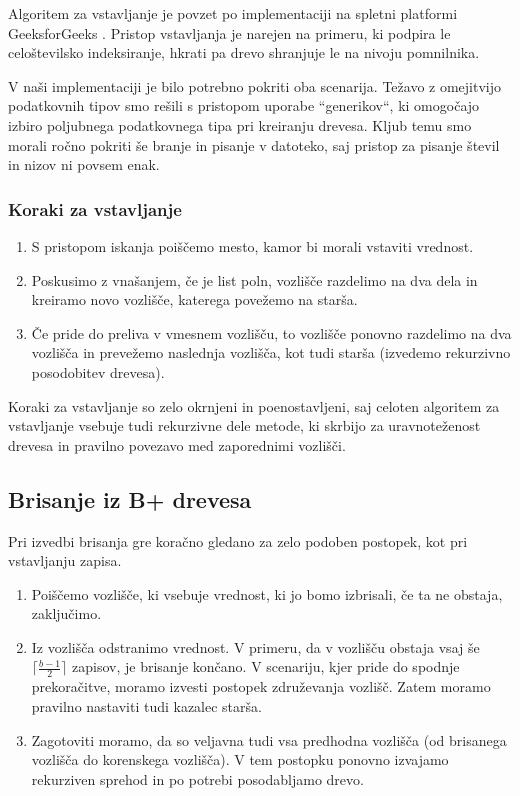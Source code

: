 \documentclass[a4paper,12pt,openright]{book}
\begin{document}
        Algoritem za vstavljanje je povzet po implementaciji na spletni platformi GeeksforGeeks \cite{G4G_BINSERT}. Pristop vstavljanja je narejen na primeru, ki podpira le celoštevilsko indeksiranje, hkrati pa drevo shranjuje le na nivoju pomnilnika.
        
        V naši implementaciji je bilo potrebno pokriti oba scenarija. Težavo z omejitvijo podatkovnih tipov smo rešili s pristopom uporabe ``generikov``, ki omogočajo izbiro poljubnega podatkovnega tipa pri kreiranju drevesa. Kljub temu smo morali ročno pokriti še branje in pisanje v datoteko, saj pristop za pisanje števil in nizov ni povsem enak.

        \subsubsection{Koraki za vstavljanje}
        
        \begin{enumerate}
            \item S pristopom iskanja poiščemo mesto, kamor bi morali vstaviti vrednost.
            \item Poskusimo z vnašanjem, če je list poln, vozlišče razdelimo na dva dela in kreiramo novo vozlišče, katerega povežemo na starša.
            \item Če pride do preliva v vmesnem vozlišču, to vozlišče ponovno razdelimo na dva vozlišča in prevežemo naslednja vozlišča, kot tudi starša (izvedemo rekurzivno posodobitev drevesa).
        \end{enumerate}

        \noindent
        Koraki za vstavljanje so zelo okrnjeni in poenostavljeni, saj celoten algoritem za vstavljanje vsebuje tudi rekurzivne dele metode, ki skrbijo za uravnoteženost drevesa in pravilno povezavo med zaporednimi vozlišči.

        \subsection{Brisanje iz B+ drevesa}

        Pri izvedbi brisanja gre koračno gledano za zelo podoben postopek, kot pri vstavljanju zapisa.

        \begin{enumerate}
            \item Poiščemo vozlišče, ki vsebuje vrednost, ki jo bomo izbrisali, če ta ne obstaja, zaključimo.
            \item Iz vozlišča odstranimo vrednost. V primeru, da v vozlišču obstaja vsaj še $\lceil \frac{b - 1}{2}\rceil$ zapisov, je brisanje končano. V scenariju, kjer pride do spodnje prekoračitve, moramo izvesti postopek združevanja vozlišč. Zatem moramo pravilno nastaviti tudi kazalec starša.
            \item Zagotoviti moramo, da so veljavna tudi vsa predhodna vozlišča (od brisanega vozlišča do korenskega vozlišča). V tem postopku ponovno izvajamo rekurziven sprehod in po potrebi posodabljamo drevo.
        \end{enumerate}
\end{document}
